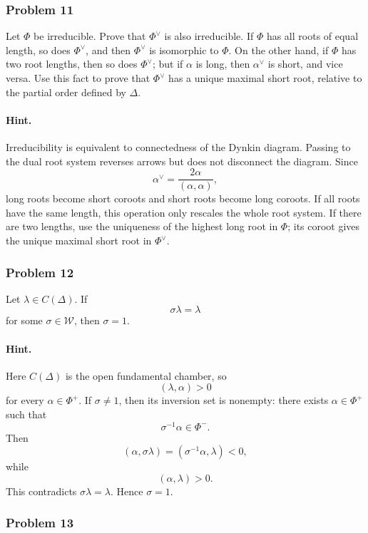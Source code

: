 \documentclass[12pt, a4paper]{article}
\begin{document}
\subsubsection{Problem 11}

Let \(\Phi\) be irreducible. Prove that \(\Phi^\vee\) is also irreducible. If
\(\Phi\) has all roots of equal length, so does \(\Phi^\vee\), and then
\(\Phi^\vee\) is isomorphic to \(\Phi\). On the other hand, if \(\Phi\) has two
root lengths, then so does \(\Phi^\vee\); but if \(\alpha\) is long, then
\(\alpha^\vee\) is short, and vice versa. Use this fact to prove that
\(\Phi^\vee\) has a unique maximal short root, relative to the partial order
defined by \(\Delta\).

\paragraph{Hint.}
Irreducibility is equivalent to connectedness of the Dynkin diagram. Passing to
the dual root system reverses arrows but does not disconnect the diagram.
Since
\[
\alpha^\vee=\frac{2\alpha}{(\alpha,\alpha)},
\]
long roots become short coroots and short roots become long coroots. If all
roots have the same length, this operation only rescales the whole root
system. If there are two lengths, use the uniqueness of the highest long root
in \(\Phi\); its coroot gives the unique maximal short root in \(\Phi^\vee\).

\subsubsection{Problem 12}

Let \(\lambda\in C(\Delta)\). If
\[
\sigma\lambda=\lambda
\]
for some \(\sigma\in\mathcal W\), then \(\sigma=1\).

\paragraph{Hint.}
Here \(C(\Delta)\) is the open fundamental chamber, so
\[
(\lambda,\alpha)>0
\]
for every \(\alpha\in\Phi^+\). If \(\sigma\neq 1\), then its inversion set is
nonempty: there exists \(\alpha\in\Phi^+\) such that
\[
\sigma^{-1}\alpha\in\Phi^-.
\]
Then
\[
(\alpha,\sigma\lambda)
=
(\sigma^{-1}\alpha,\lambda)<0,
\]
while
\[
(\alpha,\lambda)>0.
\]
This contradicts \(\sigma\lambda=\lambda\). Hence \(\sigma=1\).

\subsubsection{Problem 13}
\end{document}

